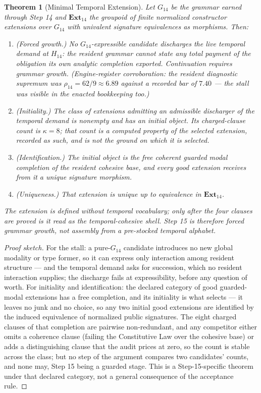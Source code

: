 \documentclass[11pt]{article}
\theoremstyle{plain}
\newtheorem{theorem}{Theorem}[section]
\theoremstyle{definition}
\theoremstyle{remark}
\newenvironment{proofsketch}{\begin{proof}[Proof sketch]}{\end{proof}}
\begin{document}
\begin{theorem}[Minimal Temporal Extension]
Let \(G_{14}\) be the grammar earned through Step 14 and \(\mathbf{Ext}_{14}\) the groupoid of finite normalized constructor extensions over \(G_{14}\) with univalent signature equivalences as morphisms. Then:
\begin{enumerate}[leftmargin=*]
\item (Forced growth.) No \(G_{14}\)-expressible candidate discharges the live temporal demand at \(H_{14}\): the resident grammar cannot state any total payment of the obligation its own analytic completion exported. Continuation requires grammar growth. (Engine-register corroboration: the resident diagnostic supremum was \(\rho_{14}=62/9\approx6.89\) against a recorded bar of \(7.40\) --- the stall was visible in the enacted bookkeeping too.)
\item (Initiality.) The class of extensions admitting an admissible discharger of the temporal demand is nonempty and has an initial object. Its charged-clause count is \(\kappa=8\); that count is a computed property of the selected extension, recorded as such, and is not the ground on which it is selected.
\item (Identification.) The initial object is the free coherent guarded modal completion of the resident cohesive base, and every good extension receives from it a unique signature morphism.
\item (Uniqueness.) That extension is unique up to equivalence in \(\mathbf{Ext}_{14}\).
\end{enumerate}
The extension is defined without temporal vocabulary; only after the four clauses are proved is it read as the temporal-cohesive shell. Step 15 is therefore forced grammar growth, not assembly from a pre-stocked temporal alphabet.
\end{theorem}

\begin{proofsketch}
For the stall: a pure-\(G_{14}\) candidate introduces no new global modality or type former, so it can express only interaction among resident structure --- and the temporal demand asks for succession, which no resident interaction supplies; the discharge fails at expressibility, before any question of worth. For initiality and identification: the declared category of good guarded-modal extensions has a free completion, and its initiality is what selects --- it leaves no junk and no choice, so any two initial good extensions are identified by the induced equivalence of normalized public signatures. The eight charged clauses of that completion are pairwise non-redundant, and any competitor either omits a coherence clause (failing the Constitutive Law over the cohesive base) or adds a distinguishing clause that the audit prices at zero, so the count is stable across the class; but no step of the argument compares two candidates' counts, and none may, Step 15 being a guarded stage. This is a Step-15-specific theorem under that declared category, not a general consequence of the acceptance rule.
\end{proofsketch}
\end{document}
